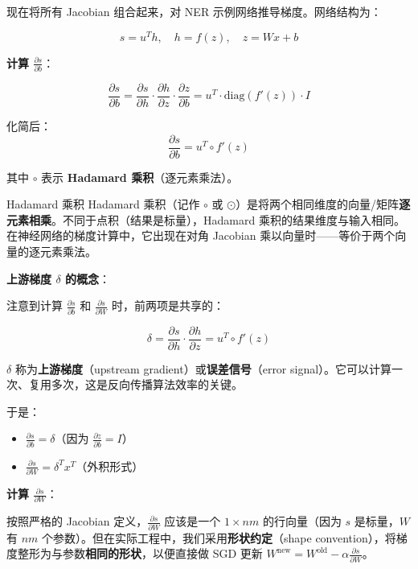\documentclass[a4paper]{article}
\begin{document}
现在将所有 Jacobian 组合起来，对 NER 示例网络推导梯度。网络结构为：

$$s = u^T h, \quad h = f(z), \quad z = Wx + b$$





\textbf{计算 $\frac{\partial s}{\partial b}$}：

$$\frac{\partial s}{\partial b} = \frac{\partial s}{\partial h} \cdot \frac{\partial h}{\partial z} \cdot \frac{\partial z}{\partial b} = u^T \cdot \text{diag}(f'(z)) \cdot I$$

化简后：
$$\frac{\partial s}{\partial b} = u^T \circ f'(z)$$

其中 $\circ$ 表示 \textbf{Hadamard 乘积}（逐元素乘法）。

\begin{knowledgebox}{Hadamard 乘积}
Hadamard 乘积（记作 $\circ$ 或 $\odot$）是将两个相同维度的向量/矩阵\textbf{逐元素相乘}。不同于点积（结果是标量），Hadamard 乘积的结果维度与输入相同。在神经网络的梯度计算中，它出现在对角 Jacobian 乘以向量时——等价于两个向量的逐元素乘法。
\end{knowledgebox}

\textbf{上游梯度 $\delta$ 的概念}：

注意到计算 $\frac{\partial s}{\partial b}$ 和 $\frac{\partial s}{\partial W}$ 时，前两项是共享的：

$$\delta = \frac{\partial s}{\partial h} \cdot \frac{\partial h}{\partial z} = u^T \circ f'(z)$$

$\delta$ 称为\textbf{上游梯度}（upstream gradient）或\textbf{误差信号}（error signal）。它可以计算一次、复用多次，这是反向传播算法效率的关键。





于是：
\begin{itemize}
    \item $\frac{\partial s}{\partial b} = \delta$（因为 $\frac{\partial z}{\partial b} = I$）
    \item $\frac{\partial s}{\partial W} = \delta^T x^T$（外积形式）
\end{itemize}

\textbf{计算 $\frac{\partial s}{\partial W}$}：





按照严格的 Jacobian 定义，$\frac{\partial s}{\partial W}$ 应该是一个 $1 \times nm$ 的行向量（因为 $s$ 是标量，$W$ 有 $nm$ 个参数）。但在实际工程中，我们采用\textbf{形状约定}（shape convention），将梯度整形为与参数\textbf{相同的形状}，以便直接做 SGD 更新 $W^{\text{new}} = W^{\text{old}} - \alpha \frac{\partial s}{\partial W}$。
\end{document}
